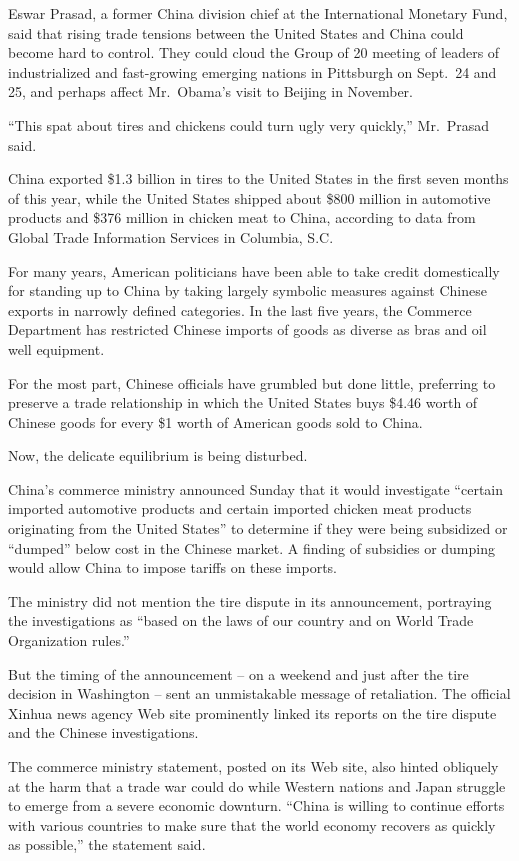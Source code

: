 ﻿\documentclass[12pt]{article}
\begin{document}
Eswar Prasad, a former China division chief at the International Monetary Fund, said that rising
trade tensions between the United States and China could become hard to control. They could cloud
the Group of 20 meeting of leaders of industrialized and fast-growing emerging nations in Pittsburgh
on Sept.~24 and 25, and perhaps affect Mr.~Obama's visit to Beijing in November.

``This spat\cite{spat} about tires and chickens could turn ugly very quickly,'' Mr.~Prasad said.

China exported \$1.3 billion in tires to the United States in the first seven months of this year,
while the United States shipped about \$800 million in automotive products and \$376 million in
chicken meat to China, according to data from Global Trade Information Services in Columbia, S.C.

For many years, American politicians have been able to take credit domestically for standing up to
China by taking largely symbolic measures against Chinese exports in narrowly defined categories. In
the last five years, the Commerce Department has restricted Chinese imports of goods as diverse as
bras and oil well equipment.

For the most part, Chinese officials have grumbled but done little, preferring to preserve a trade
relationship in which the United States buys \$4.46 worth of Chinese goods for every \$1 worth of
American goods sold to China.

Now, the delicate equilibrium is being disturbed.

China's commerce ministry announced Sunday that it would investigate ``certain imported automotive
products and certain imported chicken meat products originating from the United States'' to
determine if they were being subsidized or ``dumped'' below cost in the Chinese market. A finding of
subsidies or dumping would allow China to impose tariffs on these imports.

The ministry did not mention the tire dispute in its announcement, portraying the investigations as
``based on the laws of our country and on World Trade Organization rules.''

But the timing of the announcement -- on a weekend and just after the tire decision in Washington --
sent an unmistakable message of retaliation\cite{retaliation}. The official Xinhua news agency Web
site prominently linked its reports on the tire dispute and the Chinese investigations.

The commerce ministry statement, posted on its Web site, also hinted obliquely\cite{obliquely} at
the harm that a trade war could do while Western nations and Japan struggle to emerge from a severe
economic downturn. ``China is willing to continue efforts with various countries to make sure that
the world economy recovers as quickly as possible,'' the statement said.
\end{document}
